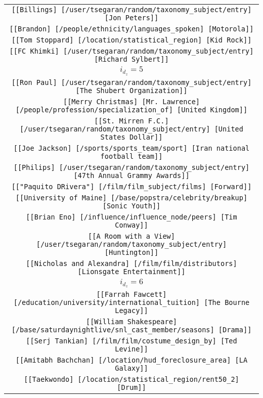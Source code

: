 \begin{longtable}{|c|}
    \texttt{[[Billings] [/user/tsegaran/random/taxonomy\_subject/entry] [Jon Peters]]}\\
    \texttt{[[Brandon] [/people/ethnicity/languages\_spoken] [Motorola]]}\\
    \texttt{[[Tom Stoppard] [/location/statistical\_region] [Kid Rock]]}\\
    \texttt{[[FC Khimki] [/user/tsegaran/random/taxonomy\_subject/entry] [Richard Sylbert]]}\\
    \hline 
    \rowcolor[HTML]{EFEFEF} 
    \textsc{$i_{d_z}=5$}\\ \hline 
    \texttt{[[Ron Paul] [/user/tsegaran/random/taxonomy\_subject/entry] [The Shubert Organization]]}\\
    \texttt{[[Merry Christmas] [Mr. Lawrence] [/people/profession/specialization\_of] [United Kingdom]]}\\
    \texttt{[[St. Mirren F.C.] [/user/tsegaran/random/taxonomy\_subject/entry] [United States Dollar]]}\\
    \texttt{[[Joe Jackson] [/sports/sports\_team/sport] [Iran national football team]]}\\
    \texttt{[[Philips] [/user/tsegaran/random/taxonomy\_subject/entry] [47th Annual Grammy Awards]]}\\
    \texttt{[["Paquito DRivera"] [/film/film\_subject/films] [Forward]]}\\
    \texttt{[[University of Maine] [/base/popstra/celebrity/breakup] [Sonic Youth]]}\\
    \texttt{[[Brian Eno] [/influence/influence\_node/peers] [Tim Conway]]}\\
    \texttt{[[A Room with a View] [/user/tsegaran/random/taxonomy\_subject/entry] [Huntington]]}\\
    \texttt{[[Nicholas and Alexandra] [/film/film/distributors] [Lionsgate Entertainment]]}\\
    \hline 
    \rowcolor[HTML]{EFEFEF} 
    \textsc{$i_{d_z}=6$}\\ \hline 
    \texttt{[[Farrah Fawcett] [/education/university/international\_tuition] [The Bourne Legacy]]}\\
    \texttt{[[William Shakespeare] [/base/saturdaynightlive/snl\_cast\_member/seasons] [Drama]]}\\
    \texttt{[[Serj Tankian] [/film/film/costume\_design\_by] [Ted Levine]]}\\
    \texttt{[[Amitabh Bachchan] [/location/hud\_foreclosure\_area] [LA Galaxy]]}\\
    \texttt{[[Taekwondo] [/location/statistical\_region/rent50\_2] [Drum]]}\\

\end{longtable}
